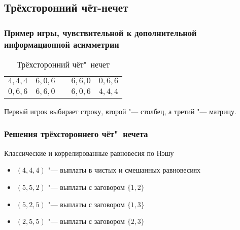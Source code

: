 
\subsection{Трёхсторонний чёт-нечет}

\begin{frame}
	\frametitle{Пример игры, чувствительной к дополнительной информационной асимметрии}
	\begin{table} [htbp]
		\centering
		\begin{threeparttable}
			\caption{Трёхсторонний чёт"~нечет}
			\begin{tabular}{ |c|c|c|c|c| }
				\cline{1-2} \cline{4-5}
				\rule[-7pt]{0pt}{2em}$4, 4, 4$ &
				\rule[-7pt]{0pt}{2em}$6, 0, 6$ & \qquad\qquad\qquad &
				\rule[-7pt]{0pt}{2em}$6, 6, 0$ &
				\rule[-7pt]{0pt}{2em}$0, 6, 6$ \\
				\cline{1-2} \cline{4-5}
				\rule[-7pt]{0pt}{2em}$0, 6, 6$ &
				\rule[-7pt]{0pt}{2em}$6, 6, 0$ & \qquad\qquad\qquad &
				\rule[-7pt]{0pt}{2em}$6, 0, 6$ &
				\rule[-7pt]{0pt}{2em}$4, 4, 4$ \\
				\cline{1-2} \cline{4-5}
			\end{tabular}
		\end{threeparttable}
	\end{table}
	Первый игрок выбирает строку, второй "--- столбец, а третий "--- матрицу.
\end{frame}

\begin{frame}
	\frametitle{Решения трёхстороннего чёт"~нечета}
	\begin{block}{Классические и коррелированные равновесия по Нэшу}
		\begin{itemize}
			\item $(4, 4, 4)$ "--- выплаты в чистых и смешанных равновесиях
			\item $(5, 5, 2)$ "--- выплаты с заговором $\{1, 2\}$ 
			\item $(5, 2, 5)$ "--- выплаты с заговором $\{1, 3\}$ 
			\item $(2, 5, 5)$ "--- выплаты с заговором $\{2, 3\}$ 
		\end{itemize}
	\end{block}
\end{frame}

